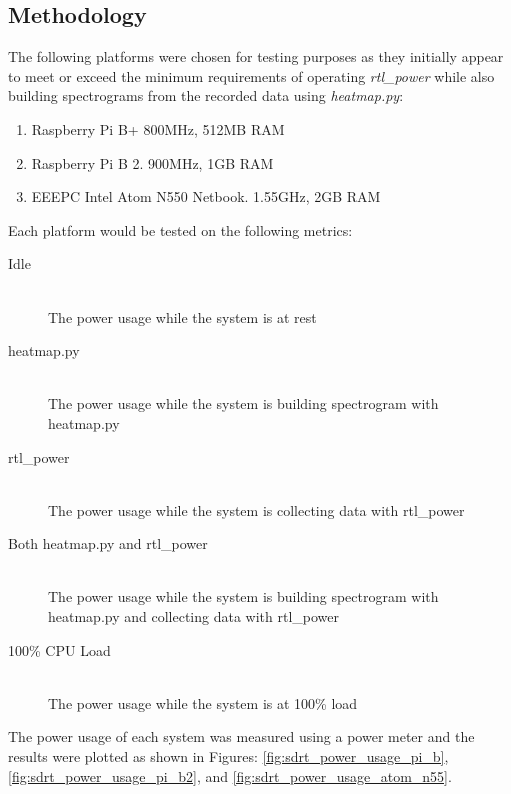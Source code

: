\documentclass[runningheads,a4paper]{llncs}
\begin{document}
\cite{bryce-11}

\subsection*{Methodology}
The following platforms were chosen for testing purposes as they initially appear to meet or exceed the minimum requirements of operating \textit{rtl\_power} while also building spectrograms from the recorded data using \textit{heatmap.py}:

\begin{enumerate}
	\item Raspberry Pi B+ 800MHz, 512MB RAM
	\item Raspberry Pi B 2. 900MHz, 1GB RAM
	\item EEEPC Intel Atom N550 Netbook. 1.55GHz, 2GB RAM
\end{enumerate}

Each platform would be tested on the following metrics:

\begin{description}
	\item [Idle] \hfil \\
	The power usage while the system is at rest
	\item [heatmap.py] \hfill \\ 
	The power usage while the system is building spectrogram with heatmap.py
	\item [rtl\_power] \hfill \\
	The power usage while the system is collecting data with rtl\_power
	\item [Both heatmap.py and rtl\_power] \hfill \\
	The power usage while the system is building spectrogram with heatmap.py and collecting data with rtl\_power
	\item [100\% CPU Load] \hfill \\
	The power usage while the system is at 100\% load
\end{description}


The power usage of each system was measured using a power meter and the results were plotted as shown in Figures: \ref{fig:sdrt_power_usage_pi_b}, \ref{fig:sdrt_power_usage_pi_b2}, and \ref{fig:sdrt_power_usage_atom_n55}.
\end{document}
